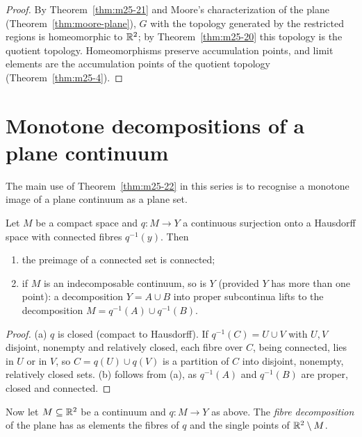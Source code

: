 \begin{proof}
By Theorem~\ref{thm:m25-21} and Moore's characterization of the plane (Theorem~\ref{thm:moore-plane}), $G$ with the
topology generated by the restricted regions is homeomorphic to $\mathbb{R}^2$; by Theorem~\ref{thm:m25-20} this topology is the
quotient topology. Homeomorphisms preserve accumulation points, and limit elements are the accumulation points of
the quotient topology (Theorem~\ref{thm:m25-4}).
\end{proof}


\section{Monotone decompositions of a plane continuum}\label{sec:monotone-quotient}

The main use of Theorem~\ref{thm:m25-22} in this series is to recognise a monotone image of a plane continuum as
a plane set.

\begin{proposition}\label{prop:monotone}
Let $M$ be a compact space and $q\colon M\to Y$ a continuous surjection onto a Hausdorff space with connected
fibres $q^{-1}(y)$. Then
\begin{enumerate}[label=(\alph*)]
\item the preimage of a connected set is connected;
\item if $M$ is an indecomposable continuum, so is $Y$ (provided $Y$ has more than one point): a decomposition
$Y=A\cup B$ into proper subcontinua lifts to the decomposition $M=q^{-1}(A)\cup q^{-1}(B)$.
\end{enumerate}
\end{proposition}

\begin{proof}
(a) $q$ is closed (compact to Hausdorff). If $q^{-1}(C)=U\cup V$ with $U,V$ disjoint, nonempty and relatively closed,
each fibre over $C$, being connected, lies in $U$ or in $V$, so $C=q(U)\cup q(V)$ is a partition of $C$ into disjoint,
nonempty, relatively closed sets. (b) follows from (a), as $q^{-1}(A)$ and $q^{-1}(B)$ are proper, closed and connected.
\end{proof}


Now let $M\subseteq\mathbb{R}^2$ be a continuum and $q\colon M\to Y$ as above. The \emph{fibre decomposition} of the plane
has as elements the fibres of $q$ and the single points of $\mathbb{R}^2\setminus M$.


